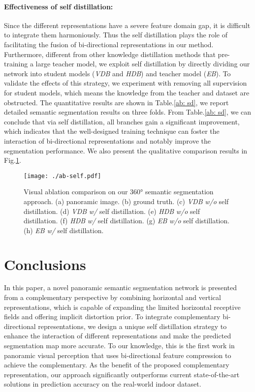 \documentclass[runningheads]{llncs}
\begin{document}
	
	
	\paragraph{Effectiveness of self distillation:} Since the different representations have a severe feature domain gap, it is difficult to integrate them harmoniously.
	Thus the self distillation plays the role of facilitating the fusion of bi-directional representations in our method.
	Furthermore, different from other knowledge distillation methods that pre-training a large teacher model, we exploit self distillation by directly dividing our network into student models (\emph{VDB} and \emph{HDB}) and teacher model (\emph{EB}).
	To validate the effects of this strategy, we experiment with removing all supervision for student models, which means the knowledge from the teacher and dataset are obstructed.
	The quantitative results are shown in Table.\ref{ab: sd}, we report detailed semantic segmentation results on three folds.
	From Table.\ref{ab: sd}, we can conclude that via self distillation, all branches gain a significant improvement, which indicates that the well-designed training technique can foster the interaction of bi-directional representations and notably improve the segmentation performance.
	We also present the qualitative comparison results in Fig.\ref{ab: segmentation map}.




	
	\begin{figure}[t]
		\centering
		\texttt{[image: ./ab-self.pdf]}
		\caption{Visual ablation comparison on our 360° semantic segmentation approach. 
			(a) panoramic image.
			(b) ground truth.
			(c) \emph{VDB} \emph{w/o} self distillation.
			(d) \emph{VDB} \emph{w/} self distillation.
			(e) \emph{HDB} \emph{w/o} self distillation.
			(f) \emph{HDB} \emph{w/} self distillation.
			(g) \emph{EB} \emph{w/o} self distillation.
			(h) \emph{EB} \emph{w/} self distillation.
		}
		\label{ab: segmentation map}
	\end{figure}
	
	
	
	\section{Conclusions}
	
	
	In this paper, a novel panoramic semantic segmentation network is presented from a complementary perspective by combining horizontal and vertical representations, which is capable of expanding the limited horizontal receptive fields and offering implicit distortion prior.
	To integrate complementary bi-directional representations, we design a unique self distillation strategy to enhance the interaction of different representations and make the predicted segmentation map more accurate.
	To our knowledge, this is the first work in panoramic visual perception that uses bi-directional feature compression to achieve the complementary.
	As the benefit of the proposed complementary representation, our approach significantly outperforms current state-of-the-art solutions in prediction accuracy on the real-world indoor dataset.
	


	
	
	\clearpage

	
\end{document}
